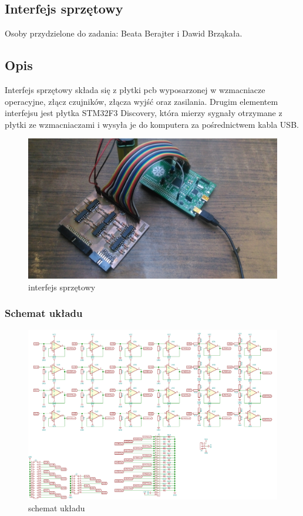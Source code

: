 \documentclass{article}
\begin{document}
\subsection{Interfejs sprzętowy}

Osoby przydzielone do zadania: Beata Berajter i Dawid Brząkała. \\
\subsection{Opis}
Interfejs sprzętowy składa się z płytki pcb wyposarzonej w wzmacniacze operacyjne, złącz czujników, złącza wyjść oraz zasilania. 
Drugim elementem interfejsu jest płytka STM32F3 Discovery, która mierzy sygnały otrzymane z płytki ze wzmacniaczami i wysyła je do komputera za pośrednictwem kabla USB.
\begin{figure}[H]
	\centering
	\includegraphics[width=12cm]{interfejs+discovery.jpg}
	\caption{interfejs sprzętowy}
	\label{rys:interfejs_sprzetowy}
\end{figure}

\subsubsection{Schemat układu}
\begin{figure}[H]
	\centering
	\includegraphics[width=15cm]{schemat.png}
	\caption{schemat układu}
	\label{rys:schemat_ukladu}
\end{figure}
\end{document}
